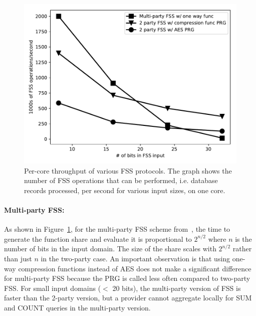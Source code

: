 \begin{figure}
	\centering
	\includegraphics[width=\textwidth]{splinter-figs/micro.pdf}
	\caption[Per-core throughput of various FSS protocols.]{Per-core throughput of various FSS protocols. 
		The graph shows the number of FSS operations that can be performed, i.e. database records processed, per second for various input sizes, on one core.}
	\label{fig:micro2}
\end{figure}


\paragraph{Multi-party FSS:}
As shown in Figure~\ref{fig:micro2}, for the multi-party FSS 
scheme from~\cite{fss},
the time to generate the function share and evaluate it is proportional
to $2^{n/2}$ where $n$ is the number of bits in the input domain. 
The size of the share scales with $2^{n/2}$
rather than just $n$ in the two-party case. 
An important observation is that using one-way compression 
functions instead of AES does not make a significant difference for multi-party 
FSS because the PRG is called less often compared to two-party FSS. 
For small input domains ($<$ 20 bits), 
the multi-party version of FSS is faster than the 2-party version, but 
a provider cannot aggregate locally for SUM and COUNT queries in the multi-party version.

